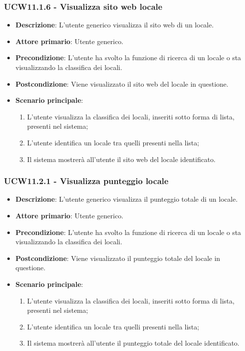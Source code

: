 \subsubsection{UCW11.1.6 - Visualizza sito web locale}
\begin{itemize}
    \item \textbf{Descrizione}: L'utente generico visualizza il sito web di un locale.
    \item \textbf{Attore primario}: Utente generico.
    \item \textbf{Precondizione}: L'utente ha svolto la funzione di ricerca di un locale o sta visualizzando la classifica dei locali.
    \item \textbf{Postcondizione}: Viene visualizzato il sito web del locale in questione.
    \item \textbf{Scenario principale}: 
    \begin{enumerate}
	\item L'utente visualizza la classifica dei locali, inseriti sotto forma di lista, presenti nel sistema;
	\item L'utente identifica un locale tra quelli presenti nella lista;
	\item Il sistema mostrerà all'utente il sito web del locale identificato.
    \end{enumerate}
\end{itemize}

\subsubsection{UCW11.2.1 - Visualizza punteggio locale}
\begin{itemize}
    \item \textbf{Descrizione}: L'utente generico visualizza il punteggio totale di un locale.
    \item \textbf{Attore primario}: Utente generico.
    \item \textbf{Precondizione}: L'utente ha svolto la funzione di ricerca di un locale o sta visualizzando la classifica dei locali.
    \item \textbf{Postcondizione}: Viene visualizzato il punteggio totale del locale in questione.
    \item \textbf{Scenario principale}: 
    \begin{enumerate}
        \item L'utente visualizza la classifica dei locali, inseriti sotto forma di lista, presenti nel sistema;
        \item L'utente identifica un locale tra quelli presenti nella lista;
        \item Il sistema mostrerà all'utente il punteggio totale del locale identificato.
        \end{enumerate}
\end{itemize}
